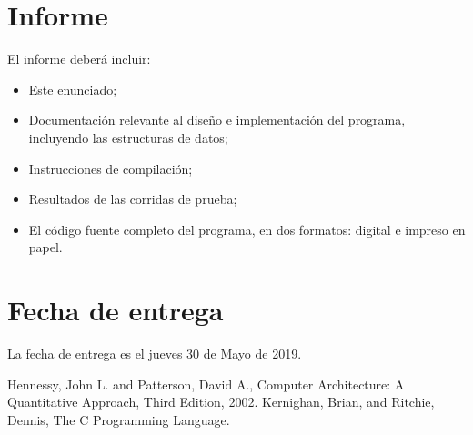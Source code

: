 \documentclass[a4paper,11pt]{article}
\begin{document}
\section{Informe}
\label{secc::informe}

El informe deberá incluir:

\begin{itemize}
\item	Este enunciado;
\item   Documentación relevante al diseño e implementación del programa, incluyendo las estructuras de datos;
\item   Instrucciones de compilación;
\item	Resultados de las corridas de prueba;
\item	El código fuente completo del programa, en dos formatos: digital e impreso en papel.
\end{itemize}


\section{Fecha de entrega}

La fecha de entrega es el jueves 30 de Mayo de 2019.

\begin{thebibliography}{99}
 {Hennessy, John L. and Patterson, David A., Computer Architecture: A Quantitative Approach, Third Edition, 2002.}
 {Kernighan, Brian, and Ritchie, Dennis, The C Programming Language.}
\end{thebibliography}
\end{document}
